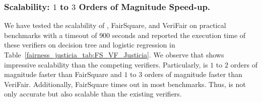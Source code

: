\subsubsection{Scalability: $ 1 $ to $ 3 $ Orders of Magnitude Speed-up.} 
We have tested the scalability of {\justicia}, FairSquare, and VeriFair on practical benchmarks with a timeout of $900$ seconds and reported the execution time of these verifiers on decision tree and logistic regression in Table~\ref{fairness_justicia_tab:FS_VF_Justicia}. We observe that {\justicia} shows impressive scalability than the competing verifiers. Particularly, {\justicia} is $ 1 $ to $ 2 $ orders of magnitude faster than FairSquare and  $ 1 $ to $ 3 $ orders of magnitude faster than VeriFair. Additionally, FairSquare times out in most  benchmarks.
Thus, {\justicia} is not only accurate but also scalable than the existing verifiers. 

